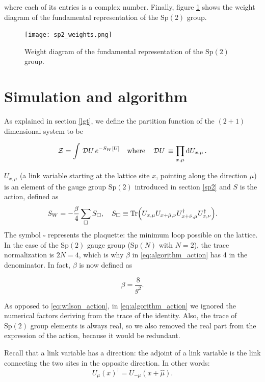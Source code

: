 \documentclass[reqno,12pt]{article}
\numberwithin{equation}{section}
\newcommand{\D}[1]{\,\mathcal{D}#1\,}
\newcommand{\Sp}{\mathrm{Sp}}
\begin{document}
where each of its entries is a complex number. Finally, figure \ref{fig:sp2weights} shows the weight diagram of the
fundamental representation of the $\Sp(2)$ group. 

\begin{figure}[h]
	\centering
	\texttt{[image: sp2\_weights.png]}
	\caption[$\Sp(2)$ weight diagram]{Weight diagram of the fundamental representation of the $\Sp(2)$ group.}
\label{fig:sp2weights}
\end{figure}


\section{Simulation and algorithm} \label{simulation}

As explained in section \ref{lgt}, we define the partition function of the $(2+1)$ dimensional system to be

\begin{equation}
	\mathcal{Z} = \int \D{U} e^{-S_W[U]} \qq{where} \D U \equiv \prod_{x,\mu} \dd{U_{x,\mu}}.
\end{equation}

$U_{x,\mu}$ (a link variable starting at the lattice site $x$, pointing
along the direction $\mu$) is an element of the gauge group $\Sp(2)$ introduced in section \ref{sp2}
and $S$ is the action, defined as
\begin{equation} \label{eq:algorithm_action}
	S_W = - \frac{\beta}{4} \sum_\square S_\square \qc 
	S_\square \equiv \Tr(U_{x,\mu}U_{x+\hat{\mu}, \nu}U^\dagger_{x+\hat{\nu}, \mu}U^\dagger_{x,\nu}).
\end{equation}
The symbol $\square$ represents the plaquette: the minimum loop possible on the lattice. In the case of the $\Sp(2)$
gauge group ($\Sp(N)$ with $N = 2$), the trace normalization is $2N = 4$, which is why $\beta$ in \eqref{eq:algorithm_action} has
4 in the denominator. In fact, $\beta$ is now defined as

\begin{equation} \label{eq:algorithm_beta}
	\beta = \frac{8}{g^2}.
\end{equation}

As opposed to \eqref{eq:wilson_action}, in \eqref{eq:algorithm_action} we ignored the numerical factors deriving from
the trace of the identity. Also, the trace of $\Sp(2)$ group elements is always real, so we also removed the real part
from the expression of the action, because it would be redundant. 

Recall that a link 
variable has a direction: the adjoint of a link variable is the link connecting the two sites in the opposite
direction. In other words:
\begin{equation}
	U_\mu(x)^\dagger = U_{-\mu}(x + \hat\mu).
\end{equation}
\end{document}
